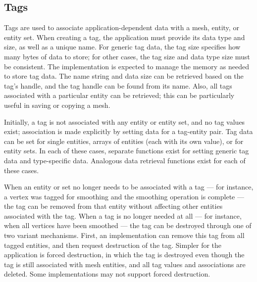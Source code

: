 \subsection{Tags\label{sub:Tag-Interface}}

Tags are used to associate application-dependent data with a mesh,
entity, or entity set. When creating a tag, the application must provide
its data type and size, as well as a unique name. For generic tag
data, the tag size specifies how many bytes of data to store; for
other cases, the tag size and data type size must be consistent. The
implementation is expected to manage the memory as needed to store
tag data. The name string and data size can be retrieved based on
the tag's handle, and the tag handle can be found from its name. Also,
all tags associated with a particular entity can be retrieved; this
can be particularly useful in saving or copying a mesh.

Initially, a tag is not associated with any entity or entity set,
and no tag values exist; association is made explicitly by setting
data for a tag-entity pair. Tag data can be set for single entities,
arrays of entities (each with its own value), or for entity sets.
In each of these cases, separate functions exist for setting generic
tag data and type-specific data. Analogous data retrieval functions
exist for each of these cases. 

When an entity or set no longer needs to be associated with a tag
--- for instance, a vertex was tagged for smoothing and the smoothing
operation is complete --- the tag can be removed from that entity
without affecting other entities associated with the tag. When a tag
is no longer needed at all --- for instance, when all vertices have
been smoothed --- the tag can be destroyed through one of two variant
mechanisms. First, an implementation can remove this tag from all
tagged entities, and then request destruction of the tag. Simpler
for the application is forced destruction, in which the tag is destroyed
even though the tag is still associated with mesh entities, and all
tag values and associations are deleted. Some implementations may
not support forced destruction.

